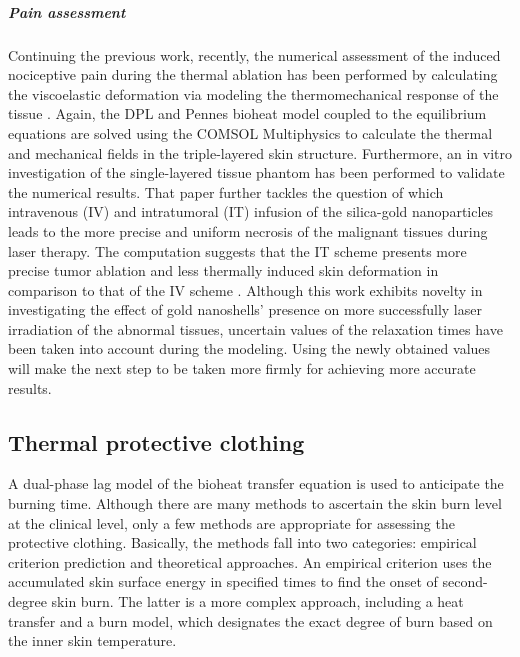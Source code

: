 \documentclass[sn-mathphys]{sn-jnl}%
\theoremstyle{thmstyleone}%
\theoremstyle{thmstyletwo}%
\theoremstyle{thmstylethree}%
\begin{document}
{%
\subparagraph{Pain assessment}
Continuing the previous work, recently, the numerical assessment of the induced nociceptive pain during the thermal ablation has been performed by calculating the viscoelastic deformation via modeling the thermomechanical response of the tissue \cite{Paul2020}. Again, the DPL and Pennes bioheat model coupled to the equilibrium equations are solved using the COMSOL Multiphysics to calculate the thermal and mechanical fields in the triple-layered skin structure. Furthermore, an in vitro investigation of the single-layered tissue phantom has been performed to validate the numerical results. That paper further tackles the question of which intravenous (IV) and intratumoral (IT) infusion of the silica-gold nanoparticles leads to the more precise and uniform necrosis of the malignant tissues during laser therapy. The computation suggests that the IT scheme presents more precise tumor ablation and less thermally induced skin deformation in comparison to that of the IV scheme \cite{APaul20201}. Although this work exhibits novelty in investigating the effect of gold nanoshells' presence on more successfully laser irradiation of the abnormal tissues, uncertain values of the relaxation times have been taken into account during the modeling. Using the newly obtained values \cite{CLi2018} will make the next step to be taken more firmly for achieving more accurate results.

\subsection{Thermal protective clothing}
A dual-phase lag model of the bioheat transfer equation is used to anticipate the burning time. Although there are many methods to ascertain the skin burn level at the clinical level, only a few methods are appropriate for assessing the protective clothing. Basically, the methods fall into two categories: empirical criterion prediction and theoretical approaches. An empirical criterion uses the accumulated skin surface energy in specified times to find the onset of second-degree skin burn. The latter is a more complex approach, including a heat transfer and a burn model, which designates the exact degree of burn based on the inner skin temperature.

}
\end{document}
